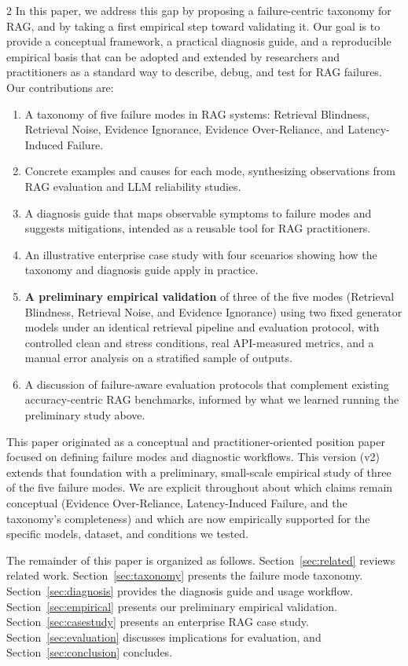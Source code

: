 \documentclass[11pt,a4paper]{article}
\begin{document}
\begin{multicols}{2}
In this paper, we address this gap by proposing a failure-centric taxonomy for RAG, and by taking a first empirical step toward validating it. Our goal is to provide a conceptual framework, a practical diagnosis guide, and a reproducible empirical basis that can be adopted and extended by researchers and practitioners as a standard way to describe, debug, and test for RAG failures. Our contributions are:
\begin{enumerate}[leftmargin=*,nosep]
\item A taxonomy of five failure modes in RAG systems: Retrieval Blindness, Retrieval Noise, Evidence Ignorance, Evidence Over-Reliance, and Latency-Induced Failure.
\item Concrete examples and causes for each mode, synthesizing observations from RAG evaluation and LLM reliability studies.
\item A diagnosis guide that maps observable symptoms to failure modes and suggests mitigations, intended as a reusable tool for RAG practitioners.
\item An illustrative enterprise case study with four scenarios showing how the taxonomy and diagnosis guide apply in practice.
\item \textbf{A preliminary empirical validation} of three of the five modes (Retrieval Blindness, Retrieval Noise, and Evidence Ignorance) using two fixed generator models under an identical retrieval pipeline and evaluation protocol, with controlled clean and stress conditions, real API-measured metrics, and a manual error analysis on a stratified sample of outputs.
\item A discussion of failure-aware evaluation protocols that complement existing accuracy-centric RAG benchmarks, informed by what we learned running the preliminary study above.
\end{enumerate}

This paper originated as a conceptual and practitioner-oriented position paper focused on defining failure modes and diagnostic workflows. This version (v2) extends that foundation with a preliminary, small-scale empirical study of three of the five failure modes. We are explicit throughout about which claims remain conceptual (Evidence Over-Reliance, Latency-Induced Failure, and the taxonomy's completeness) and which are now empirically supported for the specific models, dataset, and conditions we tested.

The remainder of this paper is organized as follows.
 Section~\ref{sec:related} reviews related work. Section~\ref{sec:taxonomy} presents the failure mode taxonomy. Section~\ref{sec:diagnosis} provides the diagnosis guide and usage workflow. Section~\ref{sec:empirical} presents our preliminary empirical validation. Section~\ref{sec:casestudy} presents an enterprise RAG case study. Section~\ref{sec:evaluation} discusses implications for evaluation, and Section~\ref{sec:conclusion} concludes.


\end{multicols}
\end{document}
